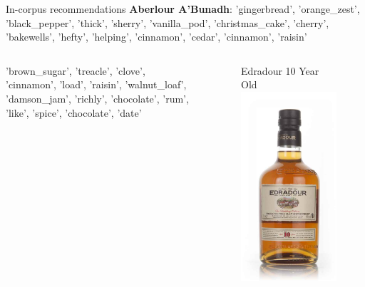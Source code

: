 \documentclass{beamer}
\begin{document}
\begin{frame}{In-corpus recommendations}
	\textbf{Aberlour A'Bunadh}: 'gingerbread', 'orange\_zest', 'black\_pepper', 'thick', 'sherry', 'vanilla\_pod', 'christmas\_cake', 'cherry', 'bakewells', 'hefty', 'helping', 'cinnamon', 'cedar', 'cinnamon', 'raisin'
	\begin{columns}
		\begin{column}{0.5\textwidth}
			
			'brown\_sugar', 'treacle', 'clove', 'cinnamon', 'load', 'raisin', 'walnut\_loaf', 'damson\_jam', 'richly', 'chocolate', 'rum', 'like', 'spice', 'chocolate', 'date'
 
		\end{column}
		\begin{column}{0.5\textwidth}
			\begin{figure}
			\begin{center}
				Edradour 10 Year Old
				\includegraphics[scale = 0.2]{edradour10}

\end{center}
\end{figure}
\end{column}
\end{columns}
\end{frame}
\end{document}
